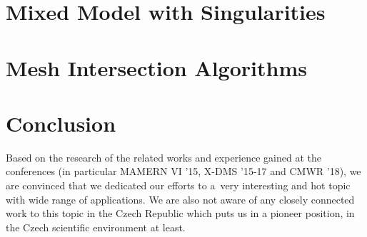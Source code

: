 \documentclass[bibliography=totocnumbered,dvipsnames,FM,Dis, EN]{tulthesis_autoreferat}
\begin{document}

\chapter{Mixed Model with Singularities} \label{chap:xfem_mh}



% 

% 



\chapter{Mesh Intersection Algorithms} \label{chap:intersections}


% 




\chapter{Conclusion} \label{chap:summary}


Based on the research of the related works and experience gained at the conferences
(in particular MAMERN VI '15, X-DMS '15-17 and CMWR '18),
we are convinced that we dedicated our efforts to a~very interesting and hot topic with wide range of applications.
We are also not aware of any closely connected work to this topic in the Czech Republic
which puts us in a pioneer position, in the Czech scientific environment at least.
\end{document}
